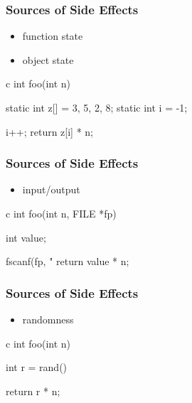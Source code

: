 \documentclass[dvipsnames]{beamer}
\theoremstyle{plain}
\begin{document}
\begin{frame}[fragile]
  \frametitle{Sources of Side Effects}

  \begin{itemize}
    \item function state
    \item object state
  \end{itemize}

  \begin{example}
    \begin{pygments}[]{c}
int foo(int n)
{
    static int z[] = {3, 5, 2, 8};
    static int i = -1;

    i++;
    return z[i] * n;
}
    \end{pygments}
  \end{example}
\end{frame}

\begin{frame}[fragile]
  \frametitle{Sources of Side Effects}

  \begin{itemize}
    \item input/output
  \end{itemize}

  \begin{example}
    \begin{pygments}[]{c}
int foo(int n, FILE *fp)
{
    int value;

    fscanf(fp, "%
    return value * n;
}
    \end{pygments}
  \end{example}
\end{frame}

\begin{frame}[fragile]
  \frametitle{Sources of Side Effects}

  \begin{itemize}
    \item randomness
  \end{itemize}

  \begin{example}
    \begin{pygments}[]{c}
int foo(int n)
{
    int r = rand() %

    return r * n;
}
    \end{pygments}
  \end{example}
\end{frame}
\end{document}
